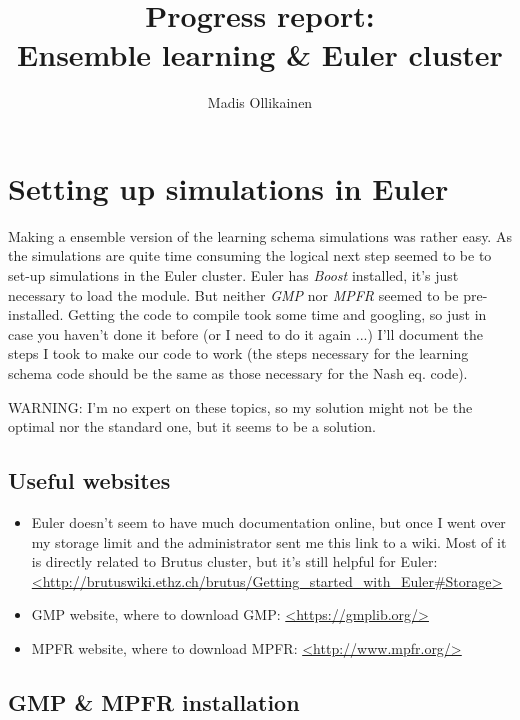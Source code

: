 \documentclass{article}
\author{Madis Ollikainen}
\title{Progress report: \\ Ensemble learning \& Euler cluster}
\begin{document}
\maketitle


\section{Setting up simulations in Euler}

Making a ensemble version of the learning schema simulations was rather easy. As the simulations are quite time consuming the logical next step seemed to be to set-up simulations in the Euler cluster. Euler has \emph{Boost} installed, it's just necessary to load the module. But neither \emph{GMP} nor \emph{MPFR} seemed to be pre-installed. Getting the code to compile took some time and googling, so just in case you haven't done it before (or I need to do it again ...) I'll document the steps I took to make our code to work (the steps necessary for the learning schema code should be the same as those necessary for the Nash eq. code). \begin{bf}WARNING: I'm no expert on these topics, so my solution might not be the optimal nor the standard one, but it seems to be a solution.\end{bf} 

\subsection{Useful websites}

\begin{itemize}
\item Euler doesn't seem to have much documentation online, but once I went over my storage limit and the administrator sent me this link to a wiki. Most of it is directly related to Brutus cluster, but it's still helpful for Euler: \\ \url{<http://brutuswiki.ethz.ch/brutus/Getting_started_with_Euler#Storage>}
\item GMP website, where to download GMP: \url{<https://gmplib.org/>}       
\item MPFR website, where to download MPFR: \url{<http://www.mpfr.org/>}
\end{itemize}

\subsection{GMP \& MPFR installation}
\end{document}
